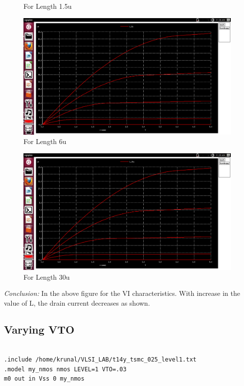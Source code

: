 \documentclass[12pt,a4paper]{article}
\begin{document}
\begin{center}
\begin{figure}[!ht]
\caption[Short]{For Length 1.5u}
\end{figure}

\begin{figure}[!ht]
\centering
\includegraphics[scale=0.34]{vary_len_6.png}
\caption[Short]{For Length 6u}
\end{figure}

\begin{figure}[!ht]
\centering
\includegraphics[scale=0.37]{vary_len_30.png}
\caption[Short]{For Length 30u}
\end{figure}

\textit{Conclusion:}  In the above figure for the VI characteristics. With increase in the value of L, the drain current decreases as shown. 
\clearpage
\subsection{Varying VTO}

\begin{lstlisting}

.include /home/krunal/VLSI_LAB/t14y_tsmc_025_level1.txt
.model my_nmos nmos LEVEL=1 VTO=.03
m0 out in Vss 0 my_nmos


\end{lstlisting}
\end{center}
\end{document}
